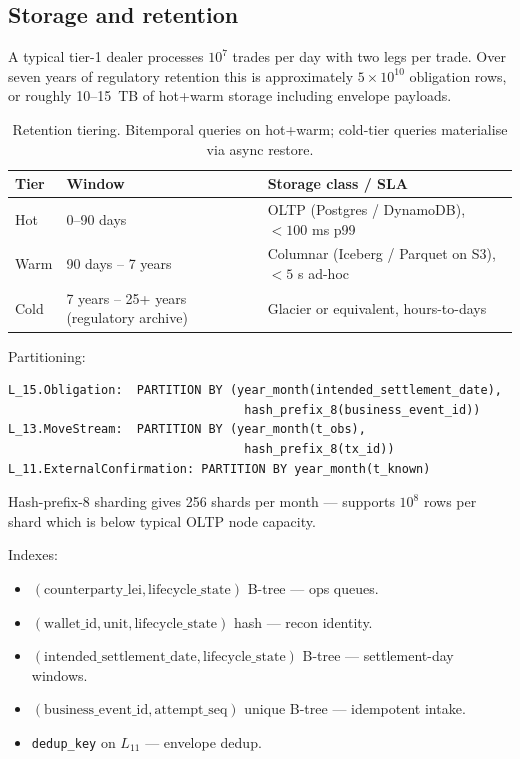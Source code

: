 \documentclass[11pt,a4paper]{article}
\begin{document}
\subsection{Storage and retention}
\label{sec:implementation-storage}

A typical tier-1 dealer processes $10^7$ trades per day with two legs per trade. Over seven years of regulatory retention this is approximately $5 \times 10^{10}$ obligation rows, or roughly 10--15~TB of hot+warm storage including envelope payloads.

\begin{table}[h]
\centering
\begin{tabular}{lll}
\toprule
\textbf{Tier} & \textbf{Window} & \textbf{Storage class / SLA} \\
\midrule
Hot   & 0--90 days                    & OLTP (Postgres / DynamoDB), $< 100$ ms p99 \\
Warm  & 90 days -- 7 years            & Columnar (Iceberg / Parquet on S3), $< 5$ s ad-hoc \\
Cold  & 7 years -- 25+ years (regulatory archive) & Glacier or equivalent, hours-to-days \\
\bottomrule
\end{tabular}
\caption{Retention tiering. Bitemporal queries on hot+warm; cold-tier queries materialise via async restore.}
\end{table}

Partitioning:

\begin{lstlisting}
L_15.Obligation:  PARTITION BY (year_month(intended_settlement_date),
                                 hash_prefix_8(business_event_id))
L_13.MoveStream:  PARTITION BY (year_month(t_obs),
                                 hash_prefix_8(tx_id))
L_11.ExternalConfirmation: PARTITION BY year_month(t_known)
\end{lstlisting}

Hash-prefix-8 sharding gives 256 shards per month --- supports $10^8$ rows per shard which is below typical OLTP node capacity.

Indexes:
\begin{itemize}[nosep]
\item $(\mathrm{counterparty\_lei}, \mathrm{lifecycle\_state})$ B-tree --- ops queues.
\item $(\mathrm{wallet\_id}, \mathrm{unit}, \mathrm{lifecycle\_state})$ hash --- recon identity.
\item $(\mathrm{intended\_settlement\_date}, \mathrm{lifecycle\_state})$ B-tree --- settlement-day windows.
\item $(\mathrm{business\_event\_id}, \mathrm{attempt\_seq})$ unique B-tree --- idempotent intake.
\item \texttt{dedup\_key} on $L_{11}$ --- envelope dedup.
\end{itemize}
\end{document}
